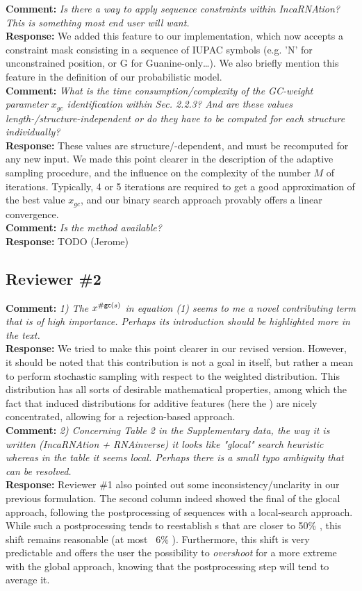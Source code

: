 \documentclass[11pt,hyperref,draft]{article} %
\newcommand{\Answer}[1]{\noindent\textsf{\textbf{Response: }}{\sf#1}\\}
\newcommand{\Comment}[1]{\noindent\textsf{\textbf{Comment: }}{\it#1}\\[.5em]}
\begin{document}
\Comment{Is there a way to apply sequence constraints within IncaRNAtion? This is something most end user will want.
}
\Answer{We added this feature to our implementation, which now accepts a constraint mask consisting in a sequence of IUPAC symbols (e.g. 'N' for unconstrained position, or G for Guanine-only\ldots). We also briefly mention this feature in the definition of our probabilistic model.}

\Comment{What is the time consumption/complexity of the GC-weight parameter $x_{gc}$ identification within Sec. 2.2.3? And are these values length-/structure-independent or do they have to be computed for each structure individually?}
\Answer{These values are structure/\GCContent-dependent, and must be recomputed for any new input. We made this point clearer in the description of the adaptive sampling procedure, and the influence on the complexity of the number $M$ of iterations. Typically, 4 or 5 iterations are required to get a good approximation of the best value $x_{gc}$, and our binary search approach provably offers a linear convergence.}

\Comment{Is the method available?}
\Answer{TODO (Jerome)}

\subsection{Reviewer \#2}

\Comment{1) The $x^{{\#\text{{\sf gc}}}(s)}$ in equation (1) seems to me a novel contributing term that is of high importance. Perhaps its introduction should be highlighted more in the text.}
\Answer{We tried to make this point clearer in our revised version. However, it should be noted that this contribution is not a goal in itself, but rather a mean to perform stochastic sampling with respect to the weighted distribution. This distribution has all sorts of desirable mathematical properties, among which the fact that induced distributions for additive features (here the \GCContent) are nicely concentrated, allowing for a rejection-based approach.}

\Comment{2) Concerning Table 2 in the Supplementary data, the way it is written (IncaRNAtion + RNAinverse) it looks like "glocal" search heuristic whereas in the table it seems local. Perhaps there is a small typo ambiguity that can be resolved.}
\Answer{Reviewer \#1 also pointed out some inconsistency/unclarity in our previous formulation. The second column indeed showed the final \GCContent of the glocal approach, following the postprocessing of sequences with a local-search approach. While such a postprocessing tends to reestablish \GCContent{}s that are  closer to 50\% \GC, this shift remains reasonable (at most ~6\% \GC). Furthermore, this shift is very predictable and offers the user the possibility to \emph{overshoot} for a more extreme \GCContent with the global approach, knowing that the postprocessing step will tend to average it.}
\end{document}
